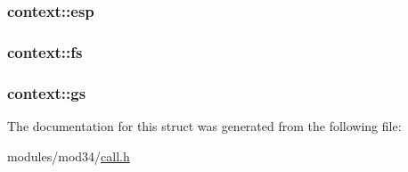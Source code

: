 \subsubsection[{esp}]{ context\+::esp}\label{structcontext_a5d56c844a4aa0dd6b7a7bf5b421cbf88}
\hypertarget{structcontext_a5e778314cc8c537f0a27726bfa673c8e}{}
\subsubsection[{fs}]{ context\+::fs}\label{structcontext_a5e778314cc8c537f0a27726bfa673c8e}
\hypertarget{structcontext_a54fa688ce896c5cca606323d33e1f68c}{}
\subsubsection[{gs}]{ context\+::gs}\label{structcontext_a54fa688ce896c5cca606323d33e1f68c}


The documentation for this struct was generated from the following file\+:\begin{DoxyCompactItemize}
\item 
modules/mod34/\hyperlink{call_8h}{call.\+h}\end{DoxyCompactItemize}
